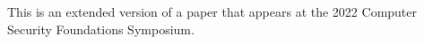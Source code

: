 \documentclass[conference,compsoc]{IEEEtran}
\newcommand{\ignore}[1]{{}}
\begin{document}
{\iftr
\bigskip
\begin{small}
 This is an extended version of a paper that
  appears at the 2022 Computer Security Foundations Symposium.
\end{small}
\fi
  










% 




\bigskip


}
\end{document}
